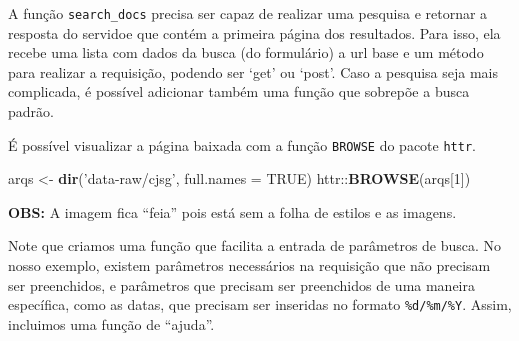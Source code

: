 \documentclass[]{book}
\newenvironment{Shaded}{\begin{snugshade}}{\end{snugshade}}
\newcommand{\KeywordTok}[1]{\textcolor[rgb]{0.13,0.29,0.53}{\textbf{{#1}}}}
\newcommand{\DataTypeTok}[1]{\textcolor[rgb]{0.13,0.29,0.53}{{#1}}}
\newcommand{\DecValTok}[1]{\textcolor[rgb]{0.00,0.00,0.81}{{#1}}}
\newcommand{\StringTok}[1]{\textcolor[rgb]{0.31,0.60,0.02}{{#1}}}
\newcommand{\OtherTok}[1]{\textcolor[rgb]{0.56,0.35,0.01}{{#1}}}
\newcommand{\NormalTok}[1]{{#1}}
\begin{document}
A função \texttt{search\_docs} precisa ser capaz de realizar uma
pesquisa e retornar a resposta do servidoe que contém a primeira página
dos resultados. Para isso, ela recebe uma lista com dados da busca (do
formulário) a url base e um método para realizar a requisição, podendo
ser `get' ou `post'. Caso a pesquisa seja mais complicada, é possível
adicionar também uma função que sobrepõe a busca padrão.

É possível visualizar a página baixada com a função \texttt{BROWSE} do
pacote \texttt{httr}.

\begin{Shaded}
\begin{Highlighting}[]
\NormalTok{arqs <-}\StringTok{ }\KeywordTok{dir}\NormalTok{(}\StringTok{'data-raw/cjsg'}\NormalTok{, }\DataTypeTok{full.names =} \OtherTok{TRUE}\NormalTok{)}
\NormalTok{httr::}\KeywordTok{BROWSE}\NormalTok{(arqs[}\DecValTok{1}\NormalTok{])}
\end{Highlighting}
\end{Shaded}

\textbf{OBS:} A imagem fica ``feia'' pois está sem a folha de estilos e
as imagens.

Note que criamos uma função que facilita a entrada de parâmetros de
busca. No nosso exemplo, existem parâmetros necessários na requisição
que não precisam ser preenchidos, e parâmetros que precisam ser
preenchidos de uma maneira específica, como as datas, que precisam ser
inseridas no formato \texttt{\%d/\%m/\%Y}. Assim, incluimos uma função
de ``ajuda''.
\end{document}
